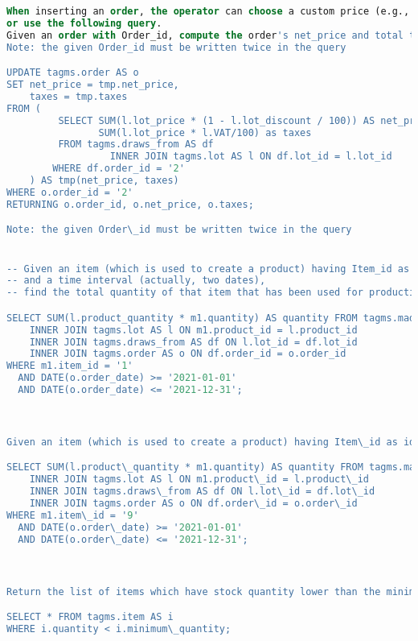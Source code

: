 \begin{lstlisting}[language=SQL,
keywordstyle=\color{blue},
stringstyle=\color{mauve},
showstringspaces=false,
basicstyle=\ttfamily\footnotesize]
When inserting an order, the operator can choose a custom price (e.g., decided with the customer)
or use the following query.
Given an order with Order_id, compute the order's net_price and total taxes.
Note: the given Order_id must be written twice in the query

UPDATE tagms.order AS o
SET net_price = tmp.net_price,
    taxes = tmp.taxes
FROM (
         SELECT SUM(l.lot_price * (1 - l.lot_discount / 100)) AS net_price,
                SUM(l.lot_price * l.VAT/100) as taxes
         FROM tagms.draws_from AS df
                  INNER JOIN tagms.lot AS l ON df.lot_id = l.lot_id
        WHERE df.order_id = '2'
    ) AS tmp(net_price, taxes)
WHERE o.order_id = '2'
RETURNING o.order_id, o.net_price, o.taxes;

Note: the given Order\_id must be written twice in the query


-- Given an item (which is used to create a product) having Item_id as identifier
-- and a time interval (actually, two dates),
-- find the total quantity of that item that has been used for production or packaging during that time.

SELECT SUM(l.product_quantity * m1.quantity) AS quantity FROM tagms.made_up_of_1 AS m1
    INNER JOIN tagms.lot AS l ON m1.product_id = l.product_id
    INNER JOIN tagms.draws_from AS df ON l.lot_id = df.lot_id
    INNER JOIN tagms.order AS o ON df.order_id = o.order_id
WHERE m1.item_id = '1'
  AND DATE(o.order_date) >= '2021-01-01'
  AND DATE(o.order_date) <= '2021-12-31';



Given an item (which is used to create a product) having Item\_id as identifier and a time interval (actually, two dates), find the total quantity of that item that has been used for production or packaging during that time.

SELECT SUM(l.product\_quantity * m1.quantity) AS quantity FROM tagms.made\_up\_of\_1 AS m1
    INNER JOIN tagms.lot AS l ON m1.product\_id = l.product\_id
    INNER JOIN tagms.draws\_from AS df ON l.lot\_id = df.lot\_id
    INNER JOIN tagms.order AS o ON df.order\_id = o.order\_id
WHERE m1.item\_id = '9'
  AND DATE(o.order\_date) >= '2021-01-01'
  AND DATE(o.order\_date) <= '2021-12-31';



Return the list of items which have stock quantity lower than the minimum one.

SELECT * FROM tagms.item AS i
WHERE i.quantity < i.minimum\_quantity;




\end{lstlisting}
